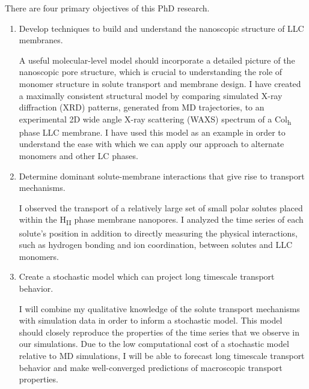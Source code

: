 \documentclass{article}
\begin{document}
  \noindent There are four primary objectives of this PhD research.
  \begin{enumerate}
  
    \item Develop techniques to build and understand the nanoscopic structure
    of LLC membranes.


    A useful molecular-level model should incorporate a detailed picture 
    of the nanoscopic pore structure, which is crucial to understanding
    the role of monomer structure in solute transport and membrane design.
    I have created a maximally consistent structural model by comparing 
    simulated X-ray diffraction (XRD) patterns, generated from MD trajectories,
    to an experimental 2D wide angle X-ray scattering (WAXS) spectrum of a 
    Col\textsubscript{h} phase LLC membrane. I have used this model as an 
    example in order to understand the ease with which we can apply our approach
    to alternate monomers and other LC phases. 
    
%    
    
    \item Determine dominant solute-membrane interactions that give rise to
    transport mechanisms.
    
    I observed the transport of a relatively large set of small polar solutes
    placed within the H\textsubscript{II} phase membrane nanopores. I analyzed
    the time series of each solute's position in addition to directly measuring
    the physical interactions, such as hydrogen bonding and ion coordination, 
    between solutes and LLC monomers.
    
    \item Create a stochastic model which can project long timescale 
    transport behavior.
    
    I will combine my qualitative knowledge of the solute transport mechanisms
    with simulation data in order to inform a stochastic model. This model
    should closely reproduce the properties of the time series that we observe 
    in our simulations. Due to the low computational cost of a stochastic model
    relative to MD simulations, I will be able to forecast long timescale transport
    behavior and make well-converged predictions of macroscopic transport properties.
           

\end{enumerate}
\end{document}
